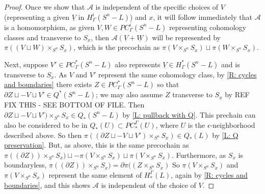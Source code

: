\documentclass[12pt]{article}
\theoremstyle{plain}
\theoremstyle{definition}
\theoremstyle{remark}
\newcommand{\uW}{\underline{W}}
\newcommand{\uV}{\underline{V}}
\newcommand{\bd}{\partial}
\newcommand{\mc}[1]{\mathcal{#1}}
\begin{document}
\begin{proof}
Once we show that $\mc A$ is independent of the specific choices of $V$ (representing a given $\uV$ in $H^i_\Gamma(S^n-L)$) and $x$, it will follow immediately that $\mc A$ is a homomorphism, as given $V,W\in PC^i_\Gamma(S^n-L)$ representing cohomology classes and transverse to $S_x$, then $\mc A(\uV + \uW)$ will be represented by $\pi((V \sqcup W) \times_{S^n} S_x)$, which is the precochain as $\pi(V  \times_{S^n} S_x) \sqcup \pi(W \times_{S^n} S_x)$.

Next, suppose $V' \in PC^*_\Gamma(S^n-L)$ also represents $\uV \in H^*_\Gamma(S^n-L)$ and is transverse to $S_x$.
As $V$ and $V'$ represent the same cohomology class, by \cref{R: cycles and boundaries} there exists $Z \in PC^*_\Gamma(S^n-L)$ so that $\bd Z\sqcup -V \sqcup V' \in Q^*(S^n-L)$; we may also assume $Z$ transverse to $S_x$ by REF FIX THIS - SEE BOTTOM OF FILE.
Then $\bd Z \sqcup -V \sqcup V') \times_{S^n} S_x \in Q_*(S^n-L)$ by \cref{L: pullback with Q}.
This prechain can also be considered to be in $Q_*(U) \subset PC_*^\Gamma(U)$, where $U$ is the $\epsilon$-neighborhood described above.
So then $\pi((\bd Z \sqcup -V \sqcup V') \times_{S^n} S_x ) \in Q_*(L)$ by \cref{L: Q preservation}.
But, as above, this is the same precochain as  $\pi((\bd Z)) \times_{S^n} S_x ) \sqcup -\pi(V  \times_{S^n} S_x) \sqcup \pi(V \times_{S^n} S_x)$.
Furthermore, as $S_x$ is boundaryless, $\pi((\bd Z)) \times_{S^n} S_x) = \bd \pi((Z \times_{S^n} S_x)$
So $\pi(V  \times_{S^n} S_x)$ and $\pi(V  \times_{S^n} S_x)$ represent the same element of $H_*^\Gamma(L)$, again by \cref{R: cycles and boundaries}, and this shows $\mc A$ is independent of the choice of $V$.


\end{proof}
\end{document}

